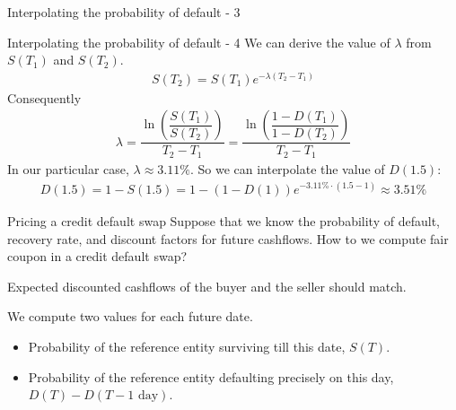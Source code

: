 \documentclass{beamer}
\begin{document}
\begin{frame}{Interpolating the probability of default - 3}
\centering
{}
\end{frame}




\begin{frame}{Interpolating the probability of default - 4}
\justify
We can derive the value of $\lambda$ from $S(T_1)$ and $S(T_2)$.
\begin{align*}
S(T_2) = S(T_1)e^{-\lambda(T_2-T_1)}
\end{align*}
Consequently
\begin{align*}
\lambda = \dfrac{\ln\left(\dfrac{S(T_1)}{S(T_2)}\right)}{T_2 - T_1} = \dfrac{\ln\left(\dfrac{1 - D(T_1)}{1 - D(T_2)}\right)}{T_2 - T_1}
\end{align*}
In our particular case, $\lambda \approx 3.11\%$. So we can interpolate the value of $D(1.5)$:
\begin{align*}
D(1.5) = 1 - S(1.5) = 1 - (1 - D(1))e^{-3.11\% \cdot (1.5 - 1)} \approx 3.51\%
\end{align*}
\end{frame}



\begin{frame}{Pricing a credit default swap}
\justify
Suppose that we know the probability of default, recovery rate, and discount factors for future cashflows. How to we compute fair coupon in a credit default swap?

\justify
Expected discounted cashflows of the buyer and the seller should match.

\justify
We compute two values for each future date.
\begin{itemize}
\item Probability of the reference entity surviving till this date, $S(T)$.
\item Probability of the reference entity defaulting precisely on this day, $D(T) - D(T - 1 \text{ day})$.
\end{itemize}
\end{frame}
\end{document}
